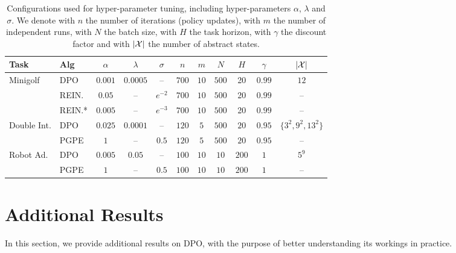 \begin{table}[H]
	\begin{tabular}{ll|ccccccccc}
		\toprule
		\textbf{Task} & \textbf{Alg} & $\alpha$ & $\lambda$ & $\sigma$ & $n$ & $m$ & $N$ & $H$ & \textbf{$\gamma$} & $|\mathcal{X}|$\\
		\midrule
		Minigolf & DPO & $0.001$ & $0.0005$ & -- & $700$ & $10$ & $500$ & 20 & $0.99$ & $12$ \\
		& REIN. & $0.05$ & -- & $e^{-2}$ & $700$ & $10$ & $500$ & 20 & $0.99$ & -- \\
		& REIN.* & $0.005$ & -- & $e^{-3}$ & $700$ & $10$ & $500$ & 20 & $0.99$ & -- \\
		\midrule
		Double Int. & DPO & $0.025$ & $0.0001$ & -- & $120$ & $5$ & $500$ & $20$ & $0.95$ & $\{3^{2},9^{2},13^{2}\}$ \\
		& PGPE & $1$ & -- & $0.5$ & $120$ & $5$ & $500$ & $20$ & $0.95$ & -- \\
		\midrule
		Robot Ad. & DPO & $0.005$ & $0.05$ & -- & $100$ & $10$ & $10$ & $200$ & $1$ & $5^{9}$ \\
		& PGPE & $1$ & -- & $0.5$ & $100$ & $10$ & $10$ & $200$ & $1$ & --\\
		\midrule
	\end{tabular}
	\caption{\label{tab:recap2}Configurations used for hyper-parameter tuning, including hyper-parameters $\alpha$, $\lambda$ and $\sigma$. We denote with $n$ the number of iterations (policy updates), with $m$ the number of independent runs, with $N$ the batch size, with $H$ the task horizon, with $\gamma$ the discount factor and with $|\mathcal{X}|$ the number of abstract states.}
\end{table}


\section{Additional Results}\label{sec:exp3}
In this section, we provide additional results on \ac{DPO}, with the purpose of better understanding its workings in practice. 

